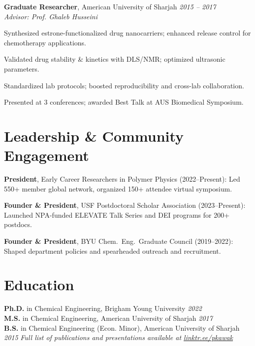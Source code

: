 \textbf{Graduate Researcher}, American University of Sharjah \hfill \textit{2015 – 2017} \\
\textit{Advisor: Prof. Ghaleb Husseini}
\begin{tabitemize}[leftmargin=*]
  \item Synthesized estrone-functionalized drug nanocarriers; enhanced release control for chemotherapy applications.
  \item Validated drug stability \& kinetics with DLS/NMR; optimized ultrasonic parameters.
  \item Standardized lab protocols; boosted reproducibility and cross-lab collaboration.
  \item Presented at 3 conferences; awarded Best Talk at AUS Biomedical Symposium.
\end{tabitemize}
\vspace{-0.7\baselineskip}
\section*{Leadership \& Community Engagement}
\begin{tabitemize}[leftmargin=*]
  \item \textbf{President}, Early Career Researchers in Polymer Physics (2022–Present): Led 550+ member global network, organized 150+ attendee virtual symposium.
  \item \textbf{Founder \& President}, USF Postdoctoral Scholar Association (2023–Present): Launched NPA-funded ELEVATE Talk Series and DEI programs for 200+ postdocs.
  \item \textbf{Founder \& President}, BYU Chem.~Eng.~Graduate Council (2019–2022): Shaped department policies and spearheaded outreach and recruitment.
\end{tabitemize}
\vspace{-0.8\baselineskip}
\section*{Education}
\textbf{Ph.D.} in Chemical Engineering, Brigham Young University \hfill \textit{2022} \\
\textbf{M.S.} in Chemical Engineering, American University of Sharjah \hfill \textit{2017} \\
\textbf{B.S.} in Chemical Engineering (Econ. Minor), American University of Sharjah \hfill \textit{2015}
\vspace{0.5em}
\noindent\textit{Full list of publications and presentations available at \href{https://linktr.ee/pkawak}{linktr.ee/pkawak}}


